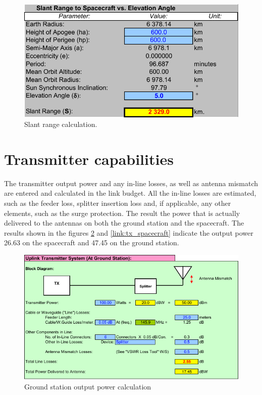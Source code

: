 \begin{figure}
    \centering
    \includegraphics[width=0.8\paperwidth]{img/6/slant_range_calc.pdf}
    \caption{Slant range calculation.}
    \label{slant_range_calc}
\end{figure}

\section{Transmitter capabilities}
The transmitter output power and any in-line losses, as well as antenna mismatch are entered and calculated in the link budget. All the in-line losses are estimated, such as the feeder loss, splitter insertion loss and, if applicable, any other elements, such as the surge protection. The result the power that is actually delivered to the antennas on both the ground station and the spacecraft. The results shown in the figures \ref{link:tx_gs} and \ref{link:tx_spacecraft} indicate the output power \SI{26.63}{\dBm} on the spacecraft and \SI{47.45}{\dBm} on the ground station.

\begin{figure}
    \centering
    \includegraphics[width=0.8\paperwidth]{img/6/tx_gs.pdf}
    \caption{Ground station output power calculation}
    \label{link:tx_gs}
\end{figure}

